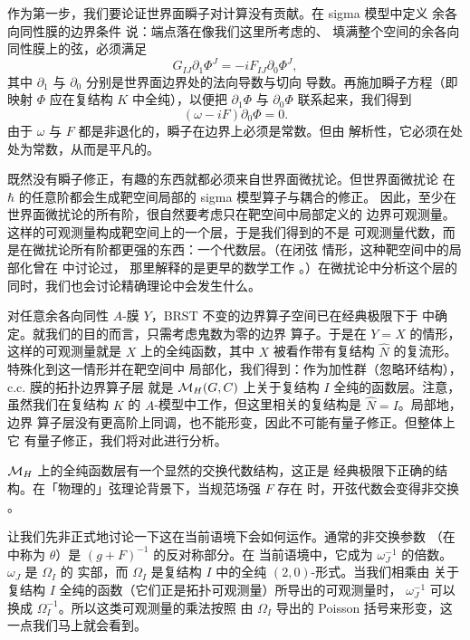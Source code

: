 作为第一步，我们要论证世界面瞬子对计算没有贡献。在 sigma 模型中定义
余各向同性膜的边界条件 \cite{ref80} 说：端点落在像我们这里所考虑的、
填满整个空间的余各向同性膜上的弦，必须满足 %
\setcounter{equation}{5}
\begin{equation}\label{eq:melbo}
G_{IJ}\partial_1\Phi^J=-i
F_{IJ}\partial_0\Phi^J,
\end{equation}
 其中 $\partial_1$ 与 $\partial_0$ 分别是世界面边界处的法向导数与切向
导数。再施加瞬子方程（即映射 $\Phi$ 应在复结构 $K$ 中全纯），以便把
$\partial_1\Phi$ 与 $\partial_0 \Phi$ 联系起来，我们得到 %
\setcounter{equation}{6}
\begin{equation}\label{eq:zimbolo}
(\omega-iF)\partial_0\Phi=0.
\end{equation}
 由于 $\omega$ 与 $F$ 都是非退化的，瞬子在边界上必须是常数。但由
解析性，它必须在处处为常数，从而是平凡的。

既然没有瞬子修正，有趣的东西就都必须来自世界面微扰论。但世界面微扰论
在 $\hbar$ 的任意阶都会生成靶空间局部的 sigma 模型算子与耦合的修正。
因此，至少在世界面微扰论的所有阶，很自然要考虑只在靶空间中局部定义的
边界可观测量。这样的可观测量构成靶空间上的一个层，于是我们得到的不是
可观测量代数，而是在微扰论所有阶都更强的东西：一个代数层。（在闭弦
情形，这种靶空间中的局部化曾在 \cite{ref133,ref134,ref135} 中讨论过，
那里解释的是更早的数学工作 \cite{ref136}。）在微扰论中分析这个层的
同时，我们也会讨论精确理论中会发生什么。

对任意余各向同性 $A$-膜 $Y$，BRST 不变的边界算子空间已在经典极限下于
\cite{ref80,ref132} 中确定。就我们的目的而言，只需考虑鬼数为零的边界
算子。于是在 $Y=X$ 的情形，这样的可观测量就是 $X$ 上的全纯函数，其中
$X$ 被看作带有复结构 $\hat N$ 的复流形。特殊化到这一情形并在靶空间中
局部化，我们得到：作为加性群（忽略环结构），c.c. 膜的拓扑边界算子层
就是 ${{{\mathcal{M}}}_H}(G,C)$ 上关于复结构 $I$ 全纯的函数层。注意，虽然我们在复结构
$K$ 的 $A$-模型中工作，但这里相关的复结构是 $\hat N=I$。局部地，边界
算子层没有更高阶上同调，也不能形变，因此不可能有量子修正。但整体上它
有量子修正，我们将对此进行分析。

 \cite{ref137}  ${{{\mathcal{M}}}_H}$ 上的全纯函数层有一个显然的交换代数结构，这正是
经典极限下正确的结构。在「物理的」弦理论背景下，当规范场强 $F$ 存在
时，开弦代数会变得非交换 \cite{ref137}。

让我们先非正式地讨论一下这在当前语境下会如何运作。通常的非交换参数
（在 \cite{ref137} 中称为 $\theta$）是 $(g+F)^{-1}$ 的反对称部分。在
当前语境中，它成为 $\omega_J^{-1}$ 的倍数。$\omega_J$ 是 $\Omega_I$ 的
实部，而 $\Omega_I$ 是复结构 $I$ 中的全纯 $(2,0)$-形式。当我们相乘由
关于复结构 $I$ 全纯的函数（它们正是拓扑可观测量）所导出的可观测量时，
$\omega_J^{-1}$ 可以换成 $\Omega_I^{-1}$。所以这类可观测量的乘法按照
由 $\Omega_I$ 导出的 Poisson 括号来形变，这一点我们马上就会看到。

